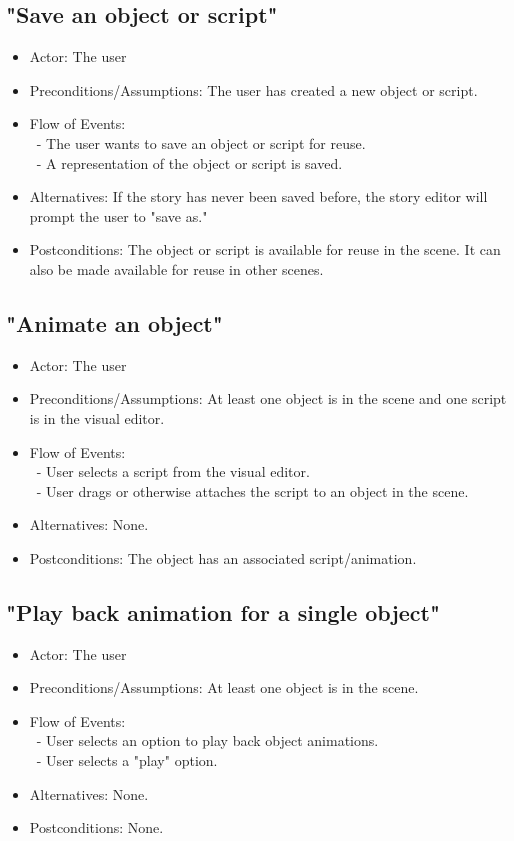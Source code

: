 \documentclass[12pt]{article}
\begin{document}
	\subsection{"Save an object or script"}
\begin{itemize}
	\item Actor: The user
		\item Preconditions/Assumptions: The user has created a new object or script.
	\item Flow of Events: \\
	\	- The user wants to save an object or script for reuse. \\
	\	- A representation of the object or script is saved.
	\item Alternatives: If the story has never been saved before, the story editor will prompt
	the user to "save as."
	\item Postconditions: The object or script is available for reuse in the scene. It can
	also be made available for reuse in other scenes.
\end{itemize}
	
	\subsection{"Animate an object"}
\begin{itemize}
	\item Actor: The user
		\item Preconditions/Assumptions: At least one object is in the scene and one script is in the visual editor.
	\item Flow of Events: \\
	\	- User selects a script from the visual editor. \\
	\	- User drags or otherwise attaches the script to an object in the scene.
	\item Alternatives: None.
	\item Postconditions: The object has an associated script/animation.
\end{itemize}

	\subsection{"Play back animation for a single object"}
\begin{itemize}
	\item Actor: The user
		\item Preconditions/Assumptions: At least one object is in the scene.
	\item Flow of Events: \\
	\	- User selects an option to play back object animations. \\
	\	- User selects a "play" option.
	\item Alternatives: None.
	\item Postconditions: None.
\end{itemize}
\end{document}
